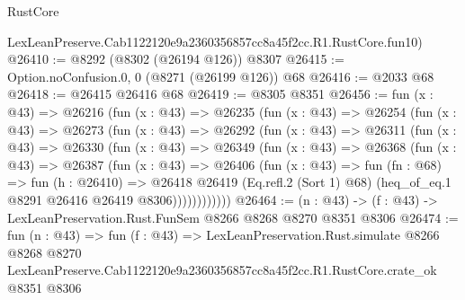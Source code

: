 \begin{lexlean}{RustCore}
\begin{coremodule}
    LexLeanPreserve.Cab1122120e9a2360356857cc8a45f2cc.R1.RustCore.fun10)
@26410 := @8292 (@8302 (@26194 @126)) @8307
@26415 := Option.noConfusion.{0, 0} (@8271 (@26199 @126)) @68
@26416 := @2033 @68
@26418 := @26415 @26416 @68
@26419 := @8305 @8351
@26456 := fun (x : @43) =>
  @26216
    (fun (x : @43) =>
    @26235
      (fun (x : @43) =>
      @26254
        (fun (x : @43) =>
        @26273
          (fun (x : @43) =>
          @26292
            (fun (x : @43) =>
            @26311
              (fun (x : @43) =>
              @26330
                (fun (x : @43) =>
                @26349
                  (fun (x : @43) =>
                  @26368
                    (fun (x : @43) =>
                    @26387
                      (fun (x : @43) =>
                      @26406
                        (fun (x : @43) =>
                        fun (fn : @68) =>
                        fun (h : @26410) =>
                        @26418
                          @26419
                          (Eq.refl.{2} (Sort 1) @68)
                          (heq_of_eq.{1} @8291 @26416 @26419 @8306))))))))))))
@26464 := (n : @43) -> (f : @43) -> LexLeanPreservation.Rust.FunSem @8266 @8268 @8270 @8351 @8306
@26474 := fun (n : @43) =>
  fun (f : @43) =>
  LexLeanPreservation.Rust.simulate
    @8266
    @8268
    @8270
    LexLeanPreserve.Cab1122120e9a2360356857cc8a45f2cc.R1.RustCore.crate_ok
    @8351
    @8306
\end{coremodule}
\end{lexlean}
